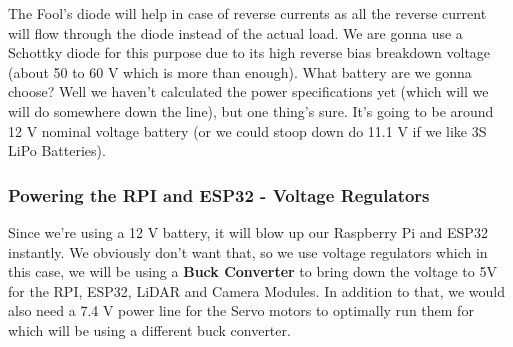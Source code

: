 \documentclass[12pt]{article}
\begin{document}
The Fool's diode will help in case of reverse currents as all the reverse current will flow through the diode instead of the actual load. We are gonna use a Schottky diode for this purpose due to its high reverse bias breakdown voltage (about 50 to 60 V which is more than enough).
\newline
What battery are we gonna choose? Well we haven't calculated the power specifications yet (which will we will do somewhere down the line), but one thing's sure. It's going to be around 12 V nominal voltage battery (or we could stoop down do 11.1 V if we like 3S LiPo Batteries).

\subsubsection*{Powering the RPI and ESP32 - Voltage Regulators}
Since we're using a 12 V battery, it will blow up our Raspberry Pi and ESP32 instantly. We obviously don't want that, so we use voltage regulators which in this case, we will be using a \textbf{Buck Converter} to bring down the voltage to 5V for the RPI, ESP32, LiDAR and Camera Modules. In addition to that, we would also need a 7.4 V power line for the Servo motors to optimally run them for which will be using a different buck converter.
\end{document}
